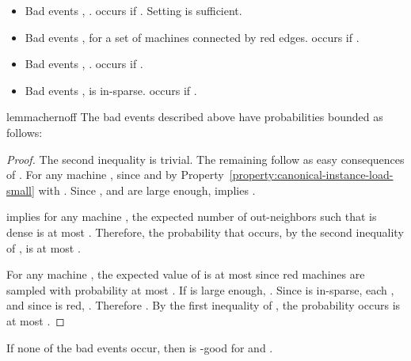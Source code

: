 \documentclass[11pt]{article}
\newcounter{prop}
\begin{document}
\begin{itemize}[itemsep=2pt,parsep=2pt]
\item {Bad events , .}  occurs if  . Setting  is sufficient.
\item {Bad events , for a set  of  machines connected by red edges.}  occurs if .
\item {Bad events , .}  occurs if  .
\item {Bad events ,  is in-sparse.}   
occurs if .
\end{itemize}

\begin{restatable}{lemma}{chernoff}
\label{lem:probabilities}
The bad events described above have probabilities bounded as follows:
\ifdefined\CR

\else

\fi
\end{restatable}	

\begin{proof}
The second inequality is trivial. The remaining follow as easy consequences of . For any machine ,  since  and by Property~\ref{property:canonical-instance-load-small} with . Since , and  are large enough,  implies . 

 implies for any machine , the expected number of out-neighbors  such that  is dense is at most .  Therefore, the probability that  occurs, by the second inequality of ,  is at most .

For any machine , the expected value of  is at most  since red machines are sampled with probability at most . If  is large enough, .  Since  is in-sparse, each , and since  is red, .  Therefore . By the first inequality of  , the probability  occurs is at most .
\end{proof}

\begin{lemma}\label{lem:no-bad-events-and-we-are-done}
If none of the bad events occur,  then  is -good  for  and  .
\end{lemma}
\end{document}
